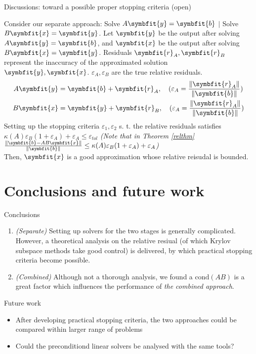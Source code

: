\documentclass[aspectratio=169]{beamer}
\renewcommand{\bm}{\symbfit}
\begin{document}
\begin{frame}{Discussions: toward a possible proper stopping criteria (open)}
	\begin{col}
		\vspace{0pt}
		Consider our separate approach:	Solve $A \bm{y} = \bm{b}$ $|$ Solve $B \bm{x} = \bm{y}$. Let $\bm{y}$ be the output after solving $A \bm{y} = \bm{b}$, and $\bm{x}$ be the output after solving $B \bm{x} = \bm{y}$. Residuals $\bm{r}_{A}, \bm{r}_{B}$ represent the inaccuracy of the approximated solution $\bm{y}, \bm{x}$. $\varepsilon_{A}, \varepsilon_{B}$ are the true relative residuals.
		\begin{align*}
			A\bm{y} & = \bm{b} + \bm{r}_{A}, \quad (\varepsilon_{A} = \frac{\|\bm{r}_{A}\|}{\|\bm{b}\|}) \\
			B \bm{x} & = \bm{y} + \bm{r}_{B}, \quad (\varepsilon_{A} = \frac{\|\bm{r}_{A}\|}{\|\bm{b}\|})
		\end{align*}
		\alert{Setting up the stopping criteria $\varepsilon_{1}, \varepsilon_{2}$ s. t. the relative residuals satisfies} $\kappa(A) \varepsilon_{B} ( 1 + \varepsilon_{A} ) + \varepsilon_{A} \leq \varepsilon_{tol}$ \textit{(Note that in Theorem \ref{relthm} $\frac{\|\bm{b} - AB \bm{x}\|}{\|\bm{b}\|} \leq \kappa(A) \varepsilon_{B} ( 1 + \varepsilon_{A} ) + \varepsilon_{A}$)}\\
		\alert{Then, $\bm{x}$ is a good approximation whose relative reisudal is bounded.}
	\end{col}
\end{frame}


\section{Conclusions and future work}
\begin{frame}{Conclusions}
	\begin{enumerate}
		\item[A1] \textit{(Separate)} Setting up solvers for the two stages is generally complicated. However, a theoretical analysis on the relative resiual (of which Krylov subspace methods take good control) is delivered, by which practical stopping criteria become possible.
		\item[A2] \textit{(Combined)} Although not a thorough analysis, we found a $\mathrm{cond}(AB)$ is a great factor which influences the performance of \textit{the combined approach}.
	\end{enumerate}	

\end{frame}
\begin{frame}{Future work}
	\begin{itemize}
		\item After developing practical stopping criteria, the two approaches could be compared within larger range of problems
		\item Could the preconditiond linear solvers be analysed with the same tools?
	\end{itemize}
\end{frame}
\end{document}
